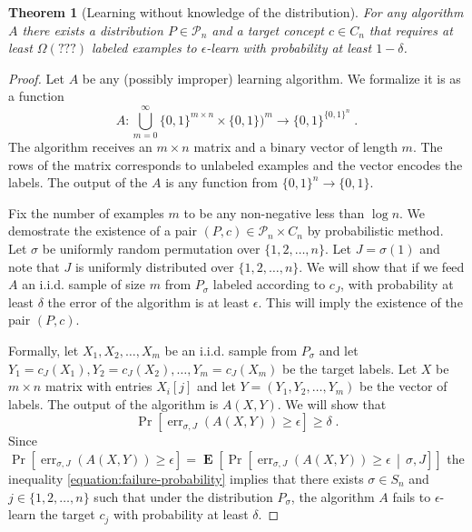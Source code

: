 \documentclass[10pt]{article}
\newtheorem{theorem}[proposition]{Theorem}
\renewcommand{\P}{\mathcal{P}}
\DeclareMathOperator{\err}{err}
\DeclareMathOperator{\Exp}{\mathbf{E}}
\begin{document}
\begin{theorem}[Learning without knowledge of the distribution]
For any algorithm $A$ there exists a distribution $P \in \P_n$
and a target concept $c \in C_n$ that requires at least $\Omega \left(??? \right)$
labeled examples to $\epsilon$-learn with probability at least $1 - \delta$.
\end{theorem}

\begin{proof}
Let $A$ be any (possibly improper) learning algorithm. We formalize it is as a function
$$
A:\bigcup_{m=0}^\infty\{0,1\}^{m \times n} \times \{0,1\})^m \to \{0,1\}^{\{0,1\}^n} \; .
$$
The algorithm receives an $m \times n$ matrix and a binary vector of length $m$.
The rows of the matrix corresponds to unlabeled examples and the vector encodes
the labels. The output of the $A$ is any function from $\{0,1\}^n \to \{0,1\}$.

Fix the number of examples $m$ to be any non-negative less than $\log n$. We
demostrate the existence of a pair $(P,c) \in \P_n \times C_n$ by probabilistic
method. Let $\sigma$ be uniformly random permutation over $\{1,2,\dots,n\}$. Let
$J = \sigma(1)$ and note that $J$ is uniformly distributed over
$\{1,2,\dots,n\}$. We will show that if we feed $A$ an i.i.d. sample of size $m$
from $P_\sigma$ labeled according to $c_J$, with probability at least $\delta$
the error of the algorithm is at least $\epsilon$. This will imply the existence
of the pair $(P,c)$.

Formally, let $X_1, X_2, \dots, X_m$ be an i.i.d. sample from $P_{\sigma}$ and
let $Y_1 = c_J(X_1), Y_2 = c_J(X_2), \dots, Y_m = c_J(X_m)$ be the target
labels. Let $X$ be $m \times n$ matrix with entries $X_i[j]$ and let $Y = (Y_1,
Y_2, \dots, Y_m)$ be the vector of labels. The output of the algorithm is $A(X,Y)$.
We will show that
\begin{equation}
\label{equation:failure-probability}
\Pr \left[\err_{\sigma,J}(A(X,Y)) \ge \epsilon \right] \ge \delta \; .
\end{equation}
Since $\Pr \left[\err_{\sigma,J}(A(X,Y)) \ge \epsilon \right] = \Exp\left[ \Pr \left[\err_{\sigma,J}(A(X,Y)) \ge \epsilon \, \middle| \, \sigma, J \right] \right]$
the inequality \eqref{equation:failure-probability} implies that there
exists $\sigma \in S_n$ and $j \in \{1,2,\dots,n\}$ such that under the
distribution $P_\sigma$, the algorithm $A$ fails to $\epsilon$-learn the target
$c_j$ with probability at least $\delta$.


\end{proof}
\end{document}
